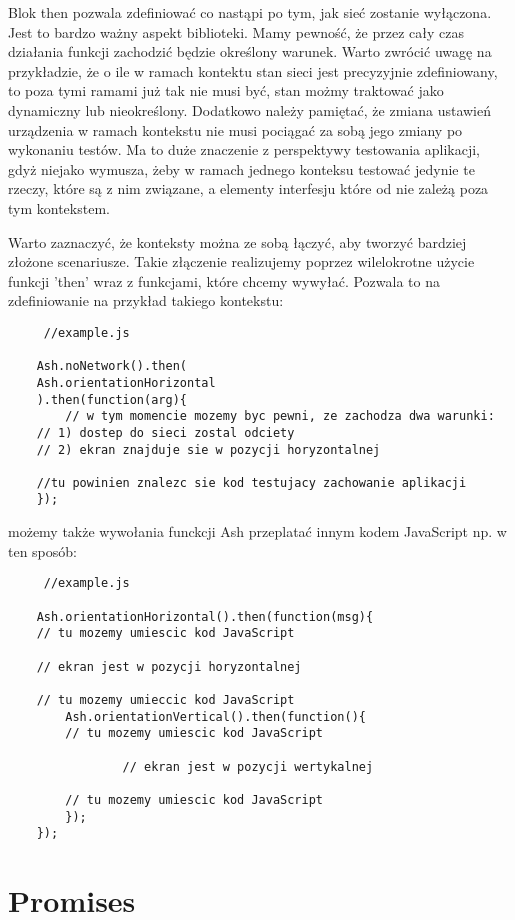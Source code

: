\documentclass[brudnopis]{xmgr}
\begin{document}
Blok then pozwala zdefiniować co nastąpi po tym, jak sieć zostanie wyłączona. Jest to bardzo ważny aspekt biblioteki. Mamy pewność, że przez cały czas działania funkcji zachodzić będzie określony warunek. Warto zwrócić uwagę na przykładzie, że o ile w ramach kontektu stan sieci jest precyzyjnie zdefiniowany, to poza tymi ramami już tak nie musi być, stan możmy traktować jako dynamiczny lub nieokreślony. Dodatkowo należy pamiętać, że zmiana ustawień urządzenia w ramach kontekstu nie musi pociągać za sobą jego zmiany po wykonaniu testów. Ma to duże znaczenie z perspektywy testowania aplikacji, gdyż niejako wymusza, żeby w ramach jednego konteksu testować jedynie te rzeczy, które są z nim związane, a elementy interfesju które od nie zależą poza tym kontekstem.

Warto zaznaczyć, że konteksty można ze sobą łączyć, aby tworzyć bardziej złożone scenariusze. Takie złączenie realizujemy poprzez wilelokrotne użycie funkcji 'then' wraz z funkcjami, które chcemy wywyłać. Pozwala to na zdefiniowanie na przykład takiego kontekstu:

\begin{lstlisting}
     //example.js

    Ash.noNetwork().then(
	Ash.orientationHorizontal
    ).then(function(arg){
      	// w tym momencie mozemy byc pewni, ze zachodza dwa warunki:
	// 1) dostep do sieci zostal odciety 
	// 2) ekran znajduje sie w pozycji horyzontalnej

	//tu powinien znalezc sie kod testujacy zachowanie aplikacji 
    });
\end{lstlisting}

możemy także wywołania funckcji Ash przeplatać innym kodem JavaScript np. w ten sposób:

\begin{lstlisting}
     //example.js

    Ash.orientationHorizontal().then(function(msg){
	// tu mozemy umiescic kod JavaScript
      	
	// ekran jest w pozycji horyzontalnej
      
	// tu mozemy umieccic kod JavaScript
      	Ash.orientationVertical().then(function(){
		// tu mozemy umiescic kod JavaScript

        		// ekran jest w pozycji wertykalnej 

		// tu mozemy umiescic kod JavaScript
      	});
    });
\end{lstlisting}

\section{Promises}
\end{document}
